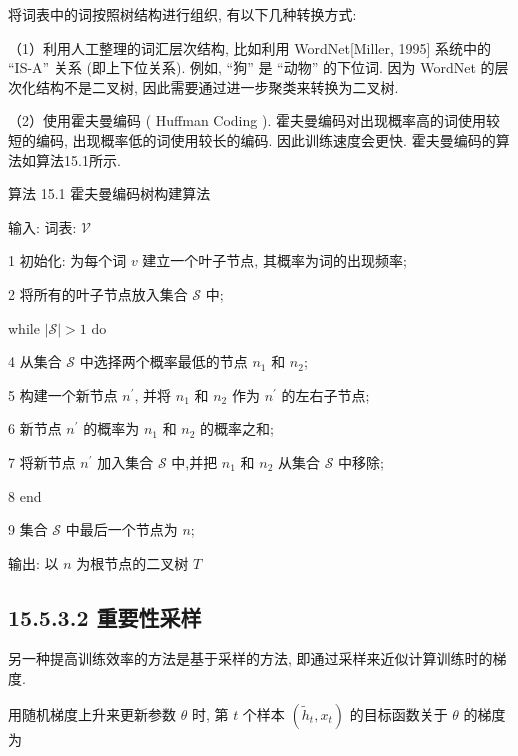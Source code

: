 \documentclass[10pt]{article}
\begin{document}
将词表中的词按照树结构进行组织, 有以下几种转换方式:

（1）利用人工整理的词汇层次结构, 比如利用 WordNet[Miller, 1995] 系统中的 “IS-A” 关系 (即上下位关系). 例如, “狗” 是 “动物” 的下位词. 因为 WordNet 的层次化结构不是二叉树, 因此需要通过进一步聚类来转换为二叉树.

（2）使用霍夫曼编码 ( Huffman Coding ). 霍夫曼编码对出现概率高的词使用较短的编码, 出现概率低的词使用较长的编码. 因此训练速度会更快. 霍夫曼编码的算法如算法15.1所示.

算法 15.1 霍夫曼编码树构建算法

输入: 词表: $\mathcal{V}$

1 初始化: 为每个词 $v$ 建立一个叶子节点, 其概率为词的出现频率;

2 将所有的叶子节点放入集合 $\mathcal{S}$ 中;

while $|\mathcal{S}|>1$ do

4 从集合 $\mathcal{S}$ 中选择两个概率最低的节点 $n_{1}$ 和 $n_{2}$;

5 构建一个新节点 $n^{\prime}$, 并将 $n_{1}$ 和 $n_{2}$ 作为 $n^{\prime}$ 的左右子节点;

6 新节点 $n^{\prime}$ 的概率为 $n_{1}$ 和 $n_{2}$ 的概率之和;

7 将新节点 $n^{\prime}$ 加入集合 $\mathcal{S}$ 中,并把 $n_{1}$ 和 $n_{2}$ 从集合 $\mathcal{S}$ 中移除;

8 end

9 集合 $\mathcal{S}$ 中最后一个节点为 $n$;

输出: 以 $n$ 为根节点的二叉树 $T$

\subsection*{15.5.3.2 重要性采样}
另一种提高训练效率的方法是基于采样的方法, 即通过采样来近似计算训练时的梯度.

用随机梯度上升来更新参数 $\theta$ 时, 第 $t$ 个样本 $\left(\tilde{h}_{t}, x_{t}\right)$ 的目标函数关于 $\theta$ 的梯度为
\end{document}

